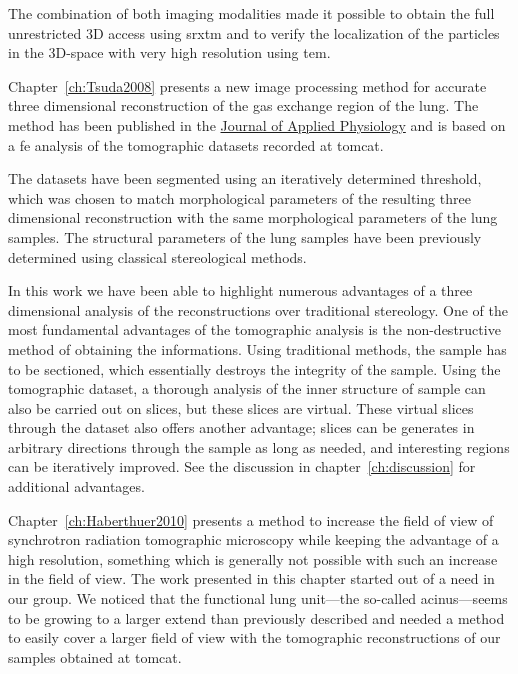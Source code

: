 The combination of both imaging modalities made it possible to obtain the full
unrestricted 3D access using \ac{srxtm} and to verify the localization of the particles in the 3D-space with very high resolution using \ac{tem}.

Chapter~\ref{ch:Tsuda2008} presents a new image processing method for accurate three dimensional reconstruction of the gas exchange region of the lung. The method has been  published in the \href{http://jap.physiology.org/}{Journal of Applied Physiology} and is based on a \ac{fe} analysis of the tomographic datasets recorded at \ac{tomcat}. 

The datasets have been segmented using an iteratively determined threshold, which was chosen to match morphological parameters of the resulting three dimensional reconstruction with the same morphological parameters of the lung samples. The structural parameters of the lung samples have been previously determined using classical stereological methods.

In this work we have been able to highlight numerous advantages of a three dimensional analysis of the reconstructions over traditional stereology. One of the most fundamental advantages of the tomographic analysis is the non-destructive method of obtaining the informations. Using traditional methods, the sample has to be sectioned, which essentially destroys the integrity of the sample. Using the tomographic dataset, a thorough analysis of the inner structure of sample can also be carried out on slices, but these slices are virtual. These virtual slices through the dataset also offers another advantage; slices can be generates in arbitrary directions through the sample as long as needed, and interesting regions can be iteratively improved. See the discussion in chapter~\ref{ch:discussion} for additional advantages.

Chapter~\ref{ch:Haberthuer2010} presents a method to increase the field of view of synchrotron radiation tomographic microscopy while keeping the advantage of a high resolution, something which is generally not possible with such an increase in the field of view. The work presented in this chapter started out of a need in our group. We noticed that the functional lung unit---the so-called acinus---seems to be growing to a larger extend than previously described  and needed a method to easily cover a larger field of view with the tomographic reconstructions of our samples obtained at \ac{tomcat}.

